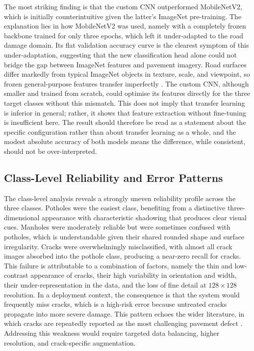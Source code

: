 \documentclass[preprint,12pt]{elsarticle}
\begin{document}
The most striking finding is that the custom CNN outperformed MobileNetV2, which is initially counterintuitive given the latter's ImageNet pre-training.
The explanation lies in how MobileNetV2 was used, namely with a completely frozen backbone trained for only three epochs, which left it under-adapted to the road damage domain.
Its flat validation accuracy curve is the clearest symptom of this under-adaptation, suggesting that the new classification head alone could not bridge the gap between ImageNet features and pavement imagery.
Road surfaces differ markedly from typical ImageNet objects in texture, scale, and viewpoint, so frozen general-purpose features transfer imperfectly \cite{pan2009survey, sandler2018mobilenetv2}.
The custom CNN, although smaller and trained from scratch, could optimise its features directly for the three target classes without this mismatch.
This does not imply that transfer learning is inferior in general; rather, it shows that feature extraction without fine-tuning is insufficient here.
The result should therefore be read as a statement about the specific configuration rather than about transfer learning as a whole, and the modest absolute accuracy of both models means the difference, while consistent, should not be over-interpreted.

\subsection{Class-Level Reliability and Error Patterns}

The class-level analysis reveals a strongly uneven reliability profile across the three classes.
Potholes were the easiest class, benefiting from a distinctive three-dimensional appearance with characteristic shadowing that produces clear visual cues.
Manholes were moderately reliable but were sometimes confused with potholes, which is understandable given their shared rounded shape and surface irregularity.
Cracks were overwhelmingly misclassified, with almost all crack images absorbed into the pothole class, producing a near-zero recall for cracks.
This failure is attributable to a combination of factors, namely the thin and low-contrast appearance of cracks, their high variability in orientation and width, their under-representation in the data, and the loss of fine detail at $128 \times 128$ resolution.
In a deployment context, the consequence is that the system would frequently miss cracks, which is a high-risk error because untreated cracks propagate into more severe damage.
This pattern echoes the wider literature, in which cracks are repeatedly reported as the most challenging pavement defect \cite{guo2023pavement, tabernik2023automated}.
Addressing this weakness would require targeted data balancing, higher resolution, and crack-specific augmentation.
\end{document}
